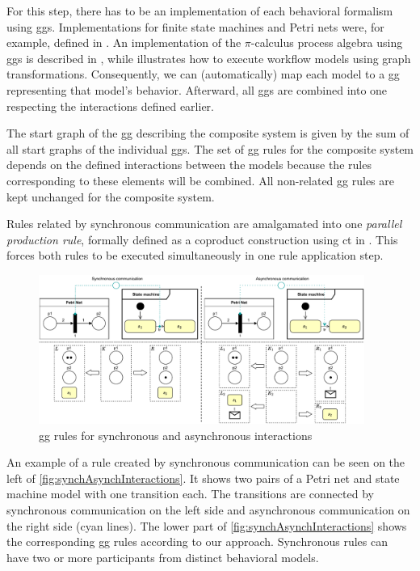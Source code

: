 \documentclass[a4paper]{easychair}
\begin{document}
For this step, there has to be an implementation of each behavioral formalism using \glspl*{gg}.
Implementations for finite state machines and Petri nets were, for example, defined in \cite{krauterBehavioralConsistencyHeterogeneous2021}.
An implementation of the $\pi$-calculus process algebra using \glspl*{gg} is described in \cite{gadducciGraphRewritingPcalculus2007}, while \cite{rutleMetamodellingApproachBehavioural2012} illustrates how to execute workflow models using graph transformations.
Consequently, we can (automatically) map each model to a \gls*{gg} representing that model's behavior.
Afterward, all \glspl*{gg} are combined into one respecting the interactions defined earlier.

The start graph of the \gls*{gg} describing the composite system is given by the sum of all start graphs of the individual \glspl*{gg}.
The set of \gls*{gg} rules for the composite system depends on the defined interactions between the models because the rules corresponding to these elements will be combined.
All non-related \gls*{gg} rules are kept unchanged for the composite system.

Rules related by synchronous communication are amalgamated into one \textit{parallel production rule}, formally defined as a coproduct construction using \gls*{ct} in \cite[Def. 3.2.7]{baldanConcurrentSemanticsAlgebraic1999}.
This forces both rules to be executed simultaneously in one rule application step. 

\begin{figure}[h]
    \centering
    \includegraphics[width=0.95\textwidth]{images/synch_asynch.pdf}
    \caption{\gls*{gg} rules for synchronous and asynchronous interactions}
    \label{fig:synchAsynchInteractions}
\end{figure}

An example of a rule created by synchronous communication can be seen on the left of \autoref{fig:synchAsynchInteractions}.
It shows two pairs of a Petri net and state machine model with one transition each.
The transitions are connected by synchronous communication on the left side and asynchronous communication on the right side (cyan lines).
The lower part of \autoref{fig:synchAsynchInteractions} shows the corresponding \gls*{gg} rules according to our approach.
Synchronous rules can have two or more participants from distinct behavioral models. 
\end{document}
